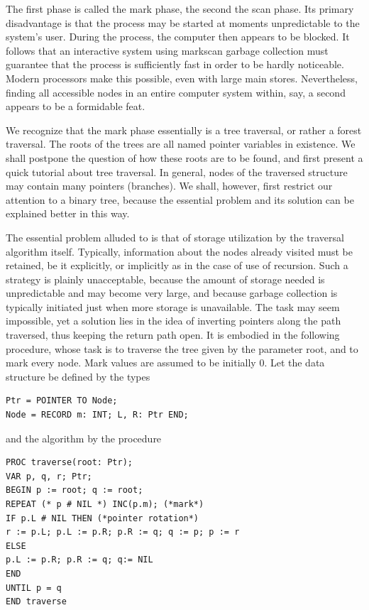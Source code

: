 The first phase is called the mark phase, the second the scan phase. Its primary disadvantage is
that the process may be started at moments unpredictable to the system's user. During the
process, the computer then appears to be blocked. It follows that an interactive system using markscan garbage collection must guarantee that the process is sufficiently fast in order to be hardly
noticeable. Modern processors make this possible, even with large main stores. Nevertheless,
finding all accessible nodes in an entire computer system within, say, a second appears to be a
formidable feat.

We recognize that the mark phase essentially is a tree traversal, or rather a forest traversal. The
roots of the trees are all named pointer variables in existence. We shall postpone the question of
how these roots are to be found, and first present a quick tutorial about tree traversal. In general,
nodes of the traversed structure may contain many pointers (branches). We shall, however, first
restrict our attention to a binary tree, because the essential problem and its solution can be
explained better in this way.

The essential problem alluded to is that of storage utilization by the traversal algorithm itself.
Typically, information about the nodes already visited must be retained, be it explicitly, or implicitly
as in the case of use of recursion. Such a strategy is plainly unacceptable, because the amount of
storage needed is unpredictable and may become very large, and because garbage collection is
typically initiated just when more storage is unavailable. The task may seem impossible, yet a
solution lies in the idea of inverting pointers along the path traversed, thus keeping the return path
open. It is embodied in the following procedure, whose task is to traverse the tree given by the
parameter root, and to mark every node. Mark values are assumed to be initially 0. Let the data
structure be defined by the types
\begin{verbatim}
Ptr = POINTER TO Node;
Node = RECORD m: INT; L, R: Ptr END;
\end{verbatim}
and the algorithm by the procedure
\begin{verbatim}
PROC traverse(root: Ptr);
VAR p, q, r; Ptr;
BEGIN p := root; q := root;
REPEAT (* p # NIL *) INC(p.m); (*mark*)
IF p.L # NIL THEN (*pointer rotation*)
r := p.L; p.L := p.R; p.R := q; q := p; p := r
ELSE
p.L := p.R; p.R := q; q:= NIL
END
UNTIL p = q
END traverse
\end{verbatim}

